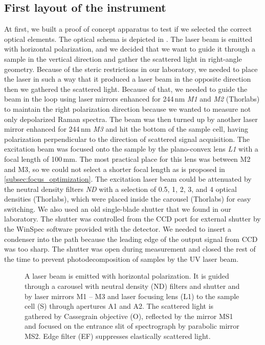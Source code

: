 \subsection{First layout of the instrument}
\label{first_layout}

At first, we built a proof of concept apparatus to test if we selected the
correct optical elements.
The optical schema is depicted in
.
The laser beam is emitted with horizontal polarization, and we decided that we
want to guide it through a sample in the vertical direction and gather the
scattered light in right-angle geometry.
Because of the steric restrictions in our laboratory, we needed to place the
laser in such a way that it produced a laser beam in the opposite direction
then we gathered the scattered light.
Because of that, we needed to guide the beam in the loop using laser mirrors
enhanced for 244\,nm \emph{M1} and \emph{M2} (Thorlabs) to maintain the right
polarization direction because we wanted to measure not only depolarized Raman
spectra.
The beam was then turned up by another laser mirror enhanced for 244\,nm
\emph{M3} and hit the bottom of the sample cell, having polarization
perpendicular to the direction of scattered signal acquisition.
The excitation beam was focused onto the sample by the plano-convex lens
\emph{L1} with a focal length of 100\,mm.
The most practical place for this lens was between M2 and M3, so we could not
select a shorter focal length as is proposed in
\cref{subsec:focus_optimization}.
The excitation laser beam could be attenuated by
the neutral density filters \emph{ND} with a selection of 0.5, 1, 2, 3, and 4
optical densities (Thorlabs), which were placed inside the carousel (Thorlabs)
for easy switching.
We also used an old single-blade shutter that we found in our laboratory.
The shutter was controlled from the CCD port for external shutter by the
WinSpec software provided with the detector.
We needed to insert a condenser into the path because the leading edge of the
output signal from CCD was too sharp.
The shutter was open during measurement and closed the rest of the time
to prevent photodecomposition of samples by the UV laser beam.

\begin{figure}
	\centering
	
	\caption[%
		Top-view schema of the apparatus with side-view inset of the sample
		space.%
	]{%
		A laser beam is emitted with horizontal polarization.
		It is guided through
			a carousel with neutral density (ND) filters
			and shutter
			and by laser mirrors M1 -- M3
			and laser focusing lens (L1)
			to the sample cell (S)
			through apertures A1 and A2.
		The scattered light is
			gathered by Cassegrain objective (O),
			reflected by the mirror MS1
			and focused on the entrance slit of spectrograph by parabolic mirror MS2.
			Edge filter (EF) suppresses elastically scattered light.
	}
	\label{\figlabel{initial_layout:apparatus_schema}}
\end{figure}

